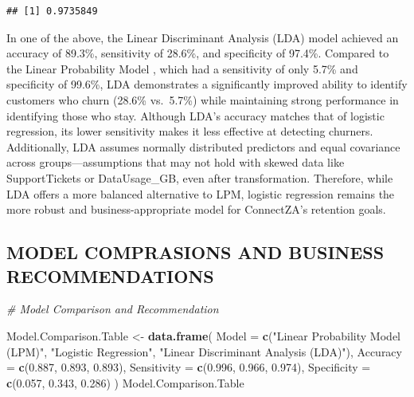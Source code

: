 \documentclass[
]{article}
\newenvironment{Shaded}{\begin{snugshade}}{\end{snugshade}}
\newcommand{\AttributeTok}[1]{\textcolor[rgb]{0.13,0.29,0.53}{#1}}
\newcommand{\CommentTok}[1]{\textcolor[rgb]{0.56,0.35,0.01}{\textit{#1}}}
\newcommand{\FloatTok}[1]{\textcolor[rgb]{0.00,0.00,0.81}{#1}}
\newcommand{\FunctionTok}[1]{\textcolor[rgb]{0.13,0.29,0.53}{\textbf{#1}}}
\newcommand{\NormalTok}[1]{#1}
\newcommand{\OtherTok}[1]{\textcolor[rgb]{0.56,0.35,0.01}{#1}}
\newcommand{\StringTok}[1]{\textcolor[rgb]{0.31,0.60,0.02}{#1}}
\begin{document}
\begin{verbatim}
## [1] 0.9735849
\end{verbatim}

\hfill\break
In one of the above, the Linear Discriminant Analysis (LDA) model
achieved an accuracy of 89.3\%, sensitivity of 28.6\%, and specificity
of 97.4\%. Compared to the Linear Probability Model , which had a
sensitivity of only 5.7\% and specificity of 99.6\%, LDA demonstrates a
significantly improved ability to identify customers who churn (28.6\%
vs.~5.7\%) while maintaining strong performance in identifying those who
stay. Although LDA's accuracy matches that of logistic regression, its
lower sensitivity makes it less effective at detecting churners.
Additionally, LDA assumes normally distributed predictors and equal
covariance across groups---assumptions that may not hold with skewed
data like SupportTickets or DataUsage\_GB, even after transformation.
Therefore, while LDA offers a more balanced alternative to LPM, logistic
regression remains the more robust and business-appropriate model for
ConnectZA's retention goals.\\

\hypertarget{model-comprasions-and-business-recommendations}{%
\subsection{MODEL COMPRASIONS AND BUSINESS
RECOMMENDATIONS}\label{model-comprasions-and-business-recommendations}}

\begin{Shaded}
\begin{Highlighting}[]
\CommentTok{\# Model Comparison and Recommendation}

\NormalTok{Model.Comparison.Table }\OtherTok{\textless{}{-}} \FunctionTok{data.frame}\NormalTok{(}
  \AttributeTok{Model =} \FunctionTok{c}\NormalTok{(}\StringTok{"Linear Probability Model (LPM)"}\NormalTok{, }
            \StringTok{"Logistic Regression"}\NormalTok{, }
            \StringTok{"Linear Discriminant Analysis (LDA)"}\NormalTok{),}
  \AttributeTok{Accuracy =} \FunctionTok{c}\NormalTok{(}\FloatTok{0.887}\NormalTok{, }\FloatTok{0.893}\NormalTok{, }\FloatTok{0.893}\NormalTok{),}
  \AttributeTok{Sensitivity =} \FunctionTok{c}\NormalTok{(}\FloatTok{0.996}\NormalTok{, }\FloatTok{0.966}\NormalTok{, }\FloatTok{0.974}\NormalTok{),}
  \AttributeTok{Specificity =} \FunctionTok{c}\NormalTok{(}\FloatTok{0.057}\NormalTok{, }\FloatTok{0.343}\NormalTok{, }\FloatTok{0.286}\NormalTok{)}
\NormalTok{)}
\NormalTok{Model.Comparison.Table}
\end{Highlighting}
\end{Shaded}
\end{document}
